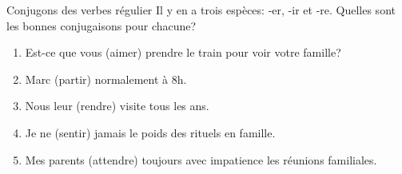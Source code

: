 \begin{frame}{Conjugons des verbes régulier}
  Il y en a trois espèces: \alert{-er}, \alert{-ir} et \alert{-re}.
  Quelles sont les bonnes conjugaisons pour chacune?
  \begin{enumerate}
    \item Est-ce que vous \underline{} (aimer) prendre le train pour voir votre famille?
    \item Marc \underline{} (partir) normalement à 8h.
    \item Nous leur \underline{} (rendre) visite tous les ans.
    \item Je ne \underline{} (sentir) jamais le poids des rituels en famille.
    \item Mes parents \underline{} (attendre) toujours avec impatience les réunions familiales.
  \end{enumerate}
\end{frame}